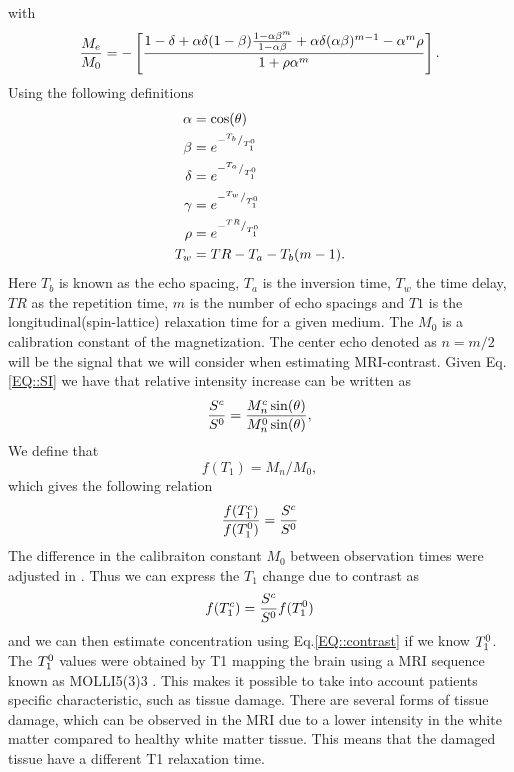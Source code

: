\documentclass[11pt,a4paper]{article}
\begin{document}
with 
\begin{equation}
\frac{M_{e}}{M_{0}} = - \left[ \frac{ 1 -\delta + \alpha \delta (1-\beta ) \frac{1-\alpha\beta\sp{m}}{1-\alpha \beta} + \alpha\delta(\alpha\beta)\sp{m-1} - \alpha\sp{m}\rho}{1 +\rho \alpha\sp{m} } \right].
\end{equation}
Using the following definitions
\begin{equation}
\begin{aligned}
\alpha &= \cos ( \theta ) \\
\beta  &= e\sp{- \sp{T_b}/_{T_1\sp{0}} } \\
\delta &= e\sp{- \sp{T_a}/_{T_1\sp{0}} } \\
\gamma &= e\sp{- \sp{T_w}/_{T_1\sp{0}} } \\
\rho   &= e\sp{- \sp{TR}/_{T_1\sp{0}}}  \\
T_w    &= TR - T_a -T_b(m-1)       .\\
\end{aligned}
\end{equation}
Here $T_b$ is known as the echo spacing, $T_a$ is the inversion time, $T_w$ the time delay, $TR$ as the repetition time, $m$ is the number of echo spacings and $T1$ is the longitudinal(spin-lattice) relaxation time for a given medium. The $M_0$ is a calibration constant of the magnetization. The center echo denoted as $n=m/2$ will be the signal that we will consider when estimating MRI-contrast. Given Eq.\ref{EQ::SI} we have that relative intensity increase can be written as 
\begin{equation}
\frac{S\sp{c}}{S\sp{0}} = \frac{ M_{n}\sp{c} \sin (\theta)}{ M_{n}\sp{0} \sin (\theta) } ,
\end{equation}
We define that  
\begin{equation}
f(T_1) = M_{n}/M_{0} ,
\label{Eq::F}
\end{equation}
which gives the following relation 
\begin{equation}
\frac{f(T_{1}\sp{c} ) }{f(T_{1}\sp{0})}  = \frac{S\sp{c}}{S\sp{0}} 
\end{equation}
The difference in the calibraiton constant $M_0$ between observation times were adjusted in \cite{eidevalnes}. Thus we can express the $T_1$ change due to contrast as 
\begin{equation}
f ( T_{1}\sp{c} ) = \frac{S\sp{c}}{S\sp{0}} f(T_{1}\sp{0}) 
\end{equation}
and we can then estimate concentration using Eq.\ref{EQ::contrast} if we know $T_{1}\sp{0}$. The $T_{1}\sp{0}$ values were obtained by T1 mapping the brain using a MRI sequence known as MOLLI5(3)3 \cite{TAYLOR201667}. This makes it possible to  take into account patients specific characteristic, such as tissue damage. There are several forms of tissue damage, which can be observed in the MRI due to a lower intensity in the white matter compared to healthy white matter tissue. This means that the damaged tissue have a different T1 relaxation time. 
\end{document}
